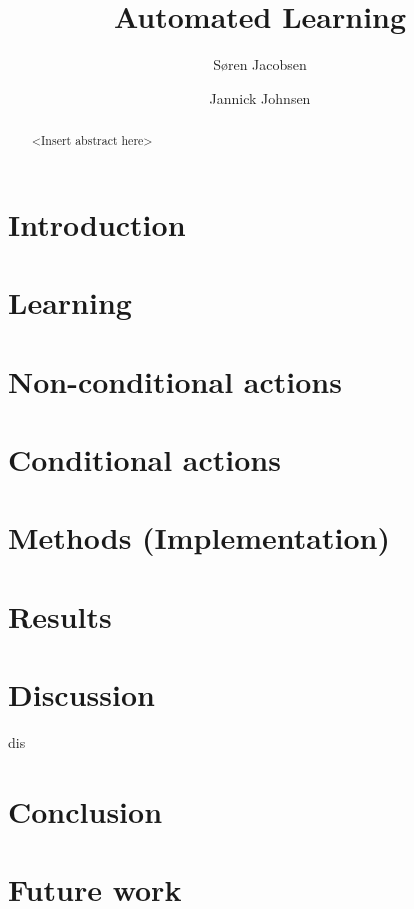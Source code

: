 \documentclass[english]{report}
\title {Automated Learning}
\author {Søren Jacobsen \and Jannick Johnsen}
\theoremstyle{definition}
\theoremstyle{plain}
\begin{document}
\newcommand{\master}{.}
\graphicspath{{Graphics/}}

\maketitle

\begin{abstract}
    <Insert abstract here>
\end{abstract}

\tableofcontents
\listofalgorithms

\chapter{Introduction}
	

\chapter{Learning} \label{sec:Learning}
    

\chapter{Non-conditional actions}
    

\chapter{Conditional actions}
    

\chapter{Methods (Implementation)}

\chapter{Results}

\chapter{Discussion}
dis
\chapter{Conclusion}

\chapter{Future work}

{}

\end{document}
